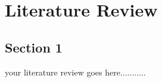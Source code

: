 \chapter{Literature Review}  %

\section{\large Section 1} %

 

 

your literature review goes here........... 

